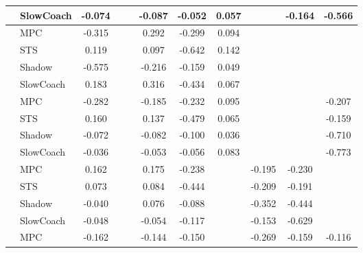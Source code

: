 \begin{tabular}{|l|l|*{9}{c|}}
                                                           & SlowCoach &   -0.074 &        &        & -0.087 & -0.052 &  0.057 &      &  -0.164 &   -0.566 \\
\midrule
[True, False, False, True, True, True, False, False, False] & MPC &   -0.315 &        &        &  0.292 & -0.299 &  0.094 &      &      &       \\
                                                           & STS &    0.119 &        &        &  0.097 & -0.642 &  0.142 &      &      &       \\
                                                           & Shadow &   -0.575 &        &        & -0.216 & -0.159 &  0.049 &      &      &       \\
                                                           & SlowCoach &    0.183 &        &        &  0.316 & -0.434 &  0.067 &      &      &       \\
\midrule
[True, False, False, True, True, True, False, False, True] & MPC &   -0.282 &        &        & -0.185 & -0.232 &  0.095 &      &      &   -0.207 \\
                                                           & STS &    0.160 &        &        &  0.137 & -0.479 &  0.065 &      &      &   -0.159 \\
                                                           & Shadow &   -0.072 &        &        & -0.082 & -0.100 &  0.036 &      &      &   -0.710 \\
                                                           & SlowCoach &   -0.036 &        &        & -0.053 & -0.056 &  0.083 &      &      &   -0.773 \\
\midrule
[True, False, False, True, True, False, True, True, False] & MPC &    0.162 &        &        &  0.175 & -0.238 &     &  -0.195 &  -0.230 &       \\
                                                           & STS &    0.073 &        &        &  0.084 & -0.444 &     &  -0.209 &  -0.191 &       \\
                                                           & Shadow &   -0.040 &        &        &  0.076 & -0.088 &     &  -0.352 &  -0.444 &       \\
                                                           & SlowCoach &   -0.048 &        &        & -0.054 & -0.117 &     &  -0.153 &  -0.629 &       \\
\midrule
[True, False, False, True, True, False, True, True, True] & MPC &   -0.162 &        &        & -0.144 & -0.150 &     &  -0.269 &  -0.159 &   -0.116 \\

\end{tabular}
